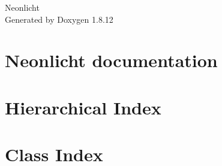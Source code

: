 \documentclass[twoside]{book}
\newcommand{\+}{\discretionary{\mbox{\scriptsize$\hookleftarrow$}}{}{}}
\newcommand{\clearemptydoublepage}{%
  \newpage{\pagestyle{empty}\cleardoublepage}%
}
\begin{document}
\hypersetup{pageanchor=false,
             bookmarksnumbered=true,
             pdfencoding=unicode
            }
\begin{titlepage}
\vspace*{7cm}
\begin{center}%
{\Large Neonlicht }\\
\vspace*{1cm}
{\large Generated by Doxygen 1.8.12}\\
\end{center}
\end{titlepage}
\clearemptydoublepage
{}
\tableofcontents
\clearemptydoublepage
{}
\hypersetup{pageanchor=true}

\chapter{Neonlicht documentation}
\label{index}\hypertarget{index}{}
\chapter{Hierarchical Index}

\chapter{Class Index}

\end{document}
